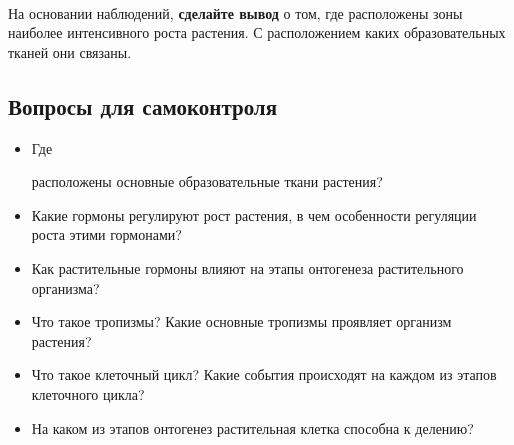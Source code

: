 \paragraph*{}На основании наблюдений, \textbf{сделайте вывод} о том, где расположены зоны наиболее интенсивного роста растения. С расположением каких образовательных тканей они связаны.

	\subsection*{Вопросы для самоконтроля}

	\begin{itemize}
		\item \hypertarget{where_meristems_plased}{Где} расположены основные образовательные ткани растения?
		\item Какие \hypertarget{chem_regulators}{гормоны} регулируют рост растения, в чем особенности регуляции роста этими гормонами?
		\item Как растительные гормоны влияют на этапы \hypertarget{chem_ontogenesis}{онтогенеза} растительного организма?
		\item Что такое тропизмы? Какие основные тропизмы проявляет организм растения?
		\item Что такое клеточный цикл? Какие события происходят на каждом из этапов клеточного цикла?
		\item На каком из этапов онтогенез растительная клетка способна к делению?
	\end{itemize}
